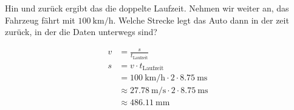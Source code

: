     Hin und zurück ergibt das die doppelte Laufzeit.
    Nehmen wir weiter an, das Fahrzeug fährt mit $\SI{100}{\kilo\meter\per\hour} $. Welche Strecke legt das Auto dann in der zeit zurück, in der die Daten unterwegs sind?


    \begin{align}
      v &= \frac{s}{t_{\text{Laufzeit}}}\\
      s &= v \cdot t_{\text{Laufzeit}} \\
        &= \SI{100}{\kilo\meter\per\hour} \cdot 2 \cdot \SI{8.75}{\milli\second}\\
        &\approx \SI{27.78}{\meter\per\second} \cdot 2 \cdot \SI{8.75}{\milli\second} \\
        &\approx \SI{486.11}{\milli\meter}
    \end{align}
  
  
    
    




